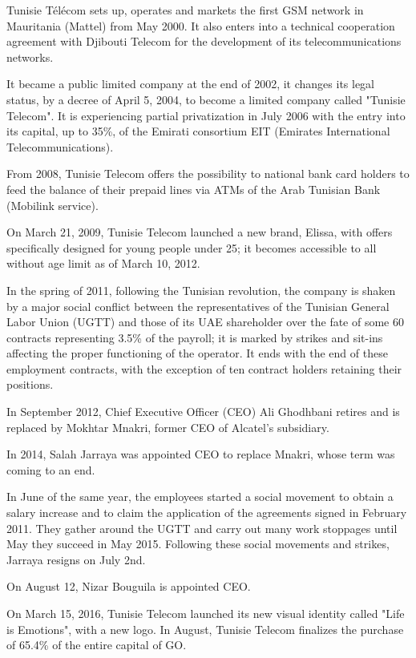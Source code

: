Tunisie Télécom sets up, operates and markets the first GSM network in Mauritania (Mattel) from May 2000. It also enters into a technical cooperation agreement with Djibouti Telecom for the development of its telecommunications networks.

It became a public limited company at the end of 2002, it changes its legal status, by a decree of April 5, 2004, to become a limited company called "Tunisie Telecom". It is experiencing partial privatization in July 2006 with the entry into its capital, up to 35\%, of the Emirati consortium EIT (Emirates International Telecommunications).

From 2008, Tunisie Telecom offers the possibility to national bank card holders to feed the balance of their prepaid lines via ATMs of the Arab Tunisian Bank (Mobilink service).

On March 21, 2009, Tunisie Telecom launched a new brand, Elissa, with offers specifically designed for young people under 25; it becomes accessible to all without age limit as of March 10, 2012.

In the spring of 2011, following the Tunisian revolution, the company is shaken by a major social conflict between the representatives of the Tunisian General Labor Union (UGTT) and those of its UAE shareholder over the fate of some 60 contracts representing 3.5\% of the payroll; it is marked by strikes and sit-ins affecting the proper functioning of the operator. It ends with the end of these employment contracts, with the exception of ten contract holders retaining their positions.

In September 2012, Chief Executive Officer (CEO) Ali Ghodhbani retires and is replaced by Mokhtar Mnakri, former CEO of Alcatel's subsidiary.

In 2014, Salah Jarraya was appointed CEO to replace Mnakri, whose term was coming to an end.

In June of the same year, the employees started a social movement to obtain a salary increase and to claim the application of the agreements signed in February 2011. They gather around the UGTT and carry out many work stoppages until May they succeed in May 2015. Following these social movements and strikes, Jarraya resigns on July 2nd.

On August 12, Nizar Bouguila is appointed CEO.

On March 15, 2016, Tunisie Telecom launched its new visual identity called "Life is Emotions", with a new logo. In August, Tunisie Telecom finalizes the purchase of 65.4\% of the entire capital of GO.

